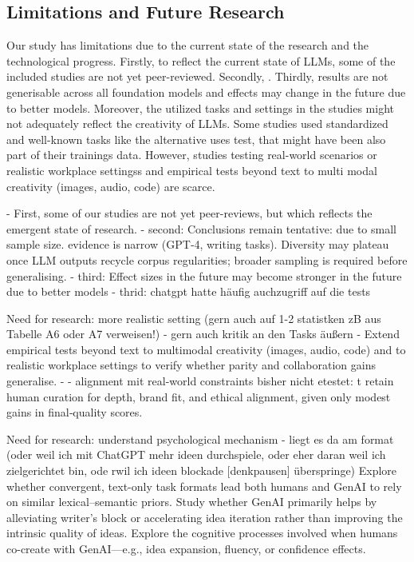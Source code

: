 \documentclass[manuscript, screen, review, acmsmall, anonymous]{acmart}
\begin{document}
\subsection{Limitations and Future Research}



Our study has limitations due to the current state of the research and the technological progress. Firstly, to reflect the current state of LLMs, some of the included studies are not yet peer-reviewed. Secondly, . Thirdly, results are not generisable across all foundation models and effects may change in the future due to better models. 
Moreover, the utilized tasks and settings in the studies might not adequately reflect the creativity of LLMs. Some studies used standardized and well-known tasks like the alternative uses test, that might have been also part of their trainings data. However, studies testing real-world scenarios or realistic workplace settingss and empirical tests beyond text to multi modal creativity  (images, audio, code) are scarce. 


- First, some of our studies are not yet peer-reviews, but which reflects the emergent state of research. 
- second: Conclusions remain tentative: due to small sample size. evidence is narrow (GPT‑4, writing tasks). Diversity may plateau once LLM outputs recycle corpus regularities; broader sampling is required before generalising.
- third: Effect sizes in the future may become stronger in the future due to better models 
- thrid: chatgpt hatte häufig auchzugriff auf die tests


Need for research: more realistic setting (gern auch auf 1-2 statistken zB aus Tabelle A6 oder A7 verweisen!)
- gern auch kritik an den Tasks äußern
-        Extend empirical tests beyond text to multimodal creativity (images, audio, code) and to realistic workplace settings to verify whether parity and collaboration gains generalise.
- 
- alignment mit real-world constraints bisher nicht etestet: t retain human curation for depth, brand fit, and ethical alignment, given only modest gains in final‑quality scores.


Need for research: understand psychological mechanism
- liegt es da am format (oder weil ich mit ChatGPT mehr ideen durchspiele, oder eher daran weil ich zielgerichtet bin, ode rwil ich ideen blockade [denkpausen] überspringe)
Explore whether convergent, text-only task formats lead both humans and GenAI to rely on similar lexical–semantic priors. Study whether GenAI primarily helps by alleviating writer’s block or accelerating idea iteration rather than improving the intrinsic quality of ideas.
Explore the cognitive processes involved when humans co-create with GenAI—e.g., idea expansion, fluency, or confidence effects.
\end{document}
